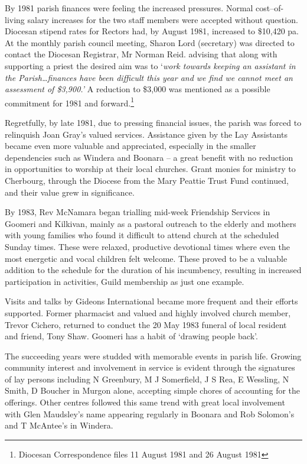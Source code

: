 By 1981 parish finances were feeling the increased pressures. Normal cost--of-living salary increases for the two staff members were accepted without question. Diocesan stipend rates for Rectors had, by August 1981, increased to \$10,420 pa. At the monthly parish council meeting, Sharon Lord (secretary) was directed to contact the Diocesan Registrar, Mr Norman Reid. advising that along with supporting a priest the desired aim was to `\emph{work towards keeping an assistant in the Parish\ldots finances have been difficult this year and we find we cannot meet an assessment of \$3,900.'} A reduction to \$3,000 was mentioned as a possible commitment for 1981 and forward.\footnote{Diocesan Correspondence files 11 August 1981 and 26 August 1981}

Regretfully, by late 1981, due to pressing financial issues, the parish was forced to relinquish Joan Gray's valued services. Assistance given by the Lay Assistants became even more valuable and appreciated, especially in the smaller dependencies such as Windera and Boonara -- a great benefit with no reduction in opportunities to worship at their local churches. Grant monies for ministry to Cherbourg, through the Diocese from the Mary Peattie Trust Fund continued, and their value grew in significance.

By 1983, Rev McNamara began trialling mid-week Friendship Services in Goomeri and Kilkivan, mainly as a pastoral outreach to the elderly and mothers with young families who found it difficult to attend church at the scheduled Sunday times. These were relaxed, productive devotional times where even the most energetic and vocal children felt welcome. These proved to be a valuable addition to the schedule for the duration of his incumbency, resulting in increased participation in activities, Guild membership as just one example.

Visits and talks by Gideons International became more frequent and their efforts supported. Former pharmacist and valued and highly involved church member, Trevor Cichero, returned to conduct the 20 May 1983 funeral of local resident and friend, Tony Shaw. Goomeri has a habit of `drawing people back'.

The succeeding years were studded with memorable events in parish life. Growing community interest and involvement in service is evident through the signatures of lay persons including N Greenbury, M J Somerfield, J S Rea, E Wessling, N Smith, D Boucher in Murgon alone, accepting simple chores of accounting for the offerings. Other centres followed this same trend with great local involvement with Glen Maudsley's name appearing regularly in Boonara and Rob Solomon's and T McAntee's in Windera.

